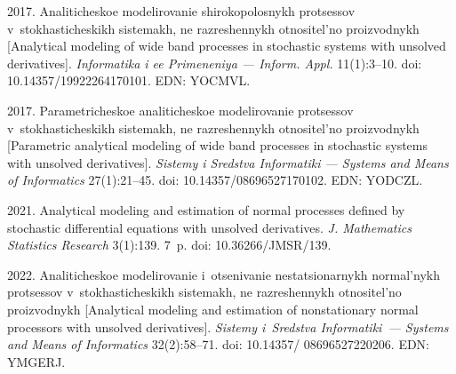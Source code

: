 

\vspace*{-12pt}


    





  \begin{multicols}{2}

\renewcommand{\bibname}{\protect\rmfamily References}

{\small\frenchspacing
 {%
 \begin{thebibliography}{99} 
 2017. 
Analiticheskoe modelirovanie shirokopolosnykh protsessov v~stokhasticheskikh sistemakh, ne razreshennykh otnositel'no proizvodnykh  
[Analytical modeling of wide band processes in stochastic systems with unsolved derivatives]. \textit{Informatika i ee Primeneniya --- Inform. Appl.} 11(1):3--10.
doi: 10.14357/19922264170101. EDN: YOCMVL.

  2017.
Parametricheskoe analiticheskoe modelirovanie protsessov v~stokhasticheskikh sistemakh, ne razreshennykh otnositel'no proizvodnykh 
[Parametric analytical modeling of wide band processes in stochastic systems with unsolved derivatives]. \textit{Sistemy i Sredstva
Informatiki --- Systems and Means of Informatics} 27(1):21--45. doi: 10.14357/08696527170102. EDN: YODCZL.

 2021. 
Analytical modeling and estimation of normal processes defined by stochastic differential equations with unsolved derivatives. 
\textit{J. Mathematics Statistics Research} 3(1):139. 7~p. doi: 10.36266/JMSR/139.

 2022. 
Analiticheskoe modelirovanie i~otse\-ni\-va\-nie nestatsionarnykh normal'nykh protsessov v~sto\-kha\-sti\-che\-skikh sistemakh, ne razreshennykh
\mbox{otno\-si\-tel'\-no} proizvodnykh 
[Analytical modeling and estimation of nonstationary normal processors with unsolved derivatives]. 
\textit{Sistemy i~Sredstva Informatiki~--- Systems and Means of Informatics} 32(2):58--71. doi: 10.14357/ 08696527220206. EDN: YMGERJ.


\end{thebibliography}}}
\end{multicols}
